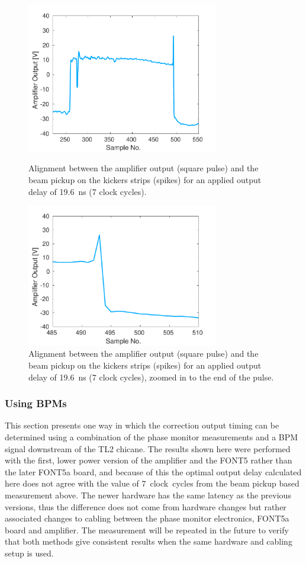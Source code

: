 \begin{figure}
  \centering
  \includegraphics[width=0.75\textwidth]{Figures/commissioning/absDelay7_all}
  \caption{Alignment between the amplifier output (square pulse) and the beam pickup on the kickers strips (spikes) for an applied output delay of 19.6~ns (7 clock cycles).}
  \label{f:absDelay7_all}
  \includegraphics[width=0.75\textwidth]{Figures/commissioning/absDelay7_end}
  \caption{Alignment between the amplifier output (square pulse) and the beam pickup on the kickers strips (spikes) for an applied output delay of 19.6~ns (7 clock cycles), zoomed in to the end of the pulse.}
  \label{f:absDelay7_end}
\end{figure}


\subsubsection{Using BPMs}
\label{sss:relativeBPM}

This section presents one way in which the correction output timing can be determined using a combination of the phase monitor measurements and a BPM signal downstream of the TL2 chicane. The results shown here were performed with the first, lower power version of the amplifier and the FONT5 rather than the later FONT5a board, and because of this the optimal output delay calculated here does not agree with the value of 7~clock~cycles from the beam pickup based measurement above. The newer hardware has the same latency as the previous versions, thus the difference does not come from hardware changes but rather associated changes to cabling between the phase monitor electronics, FONT5a board and amplifier. The measurement will be repeated in the future to verify that both methods give consistent results when the same hardware and cabling setup is used.


